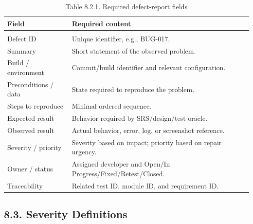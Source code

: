 {\def\LTcaptype{none} %
\begin{longtable}[]{|
  >{\raggedright\arraybackslash}m{}|
  >{\raggedright\arraybackslash}m{}|}
\hline
\begin{minipage}[c]{\linewidth}\raggedright
\textbf{Field}
\end{minipage} & \begin{minipage}[c]{\linewidth}\raggedright
\textbf{Required content}
\end{minipage} \\
\hline
\endhead

\caption*{Table 8.2.1. Required defect-report fields}\\
\endlastfoot
Defect ID & Unique identifier, e.g., BUG-017. \\ \hline
Summary & Short statement of the observed problem. \\ \hline
Build / environment & Commit/build identifier and relevant configuration. \\ \hline
Preconditions / data & State required to reproduce the problem. \\ \hline
Steps to reproduce & Minimal ordered sequence. \\ \hline
Expected result & Behavior required by SRS/design/test oracle. \\ \hline
Observed result & Actual behavior, error, log, or screenshot reference. \\ \hline
Severity / priority & Severity based on impact; priority based on repair urgency. \\ \hline
Owner / status & Assigned developer and Open/In Progress/Fixed/Retest/Closed. \\ \hline
Traceability & Related test ID, module ID, and requirement ID. \\ \hline
\end{longtable}
}

\subsection{8.3. Severity Definitions}\label{severity-definitions}

